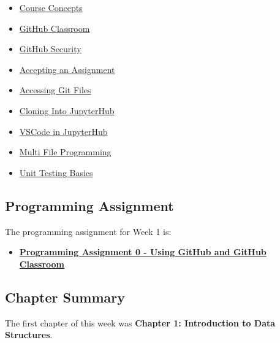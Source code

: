 \begin{itemize}
    \item \href{https://www.youtube.com/watch?v=l3e6UsF1RdQ}{Course Concepts}
    \item \href{https://www.youtube.com/watch?v=hu81oFq0nA8}{GitHub Classroom}
    \item \href{https://www.youtube.com/watch?v=7_x86HeoglQ&t=178s}{GitHub Security}
    \item \href{https://www.youtube.com/watch?v=b0Ystl84XYY}{Accepting an Assignment}
    \item \href{https://applied.cs.colorado.edu/mod/page/view.php?id=45856}{Accessing Git Files}
    \item \href{https://www.youtube.com/watch?v=M293X5ssks4}{Cloning Into JupyterHub}
    \item \href{https://www.youtube.com/watch?v=dptdfci_Zn0}{VSCode in JupyterHub}
    \item \href{https://www.youtube.com/watch?v=jchWSvAdadE}{Multi File Programming}
    \item \href{https://www.youtube.com/watch?v=tsVh8mG2tM0}{Unit Testing Basics}
\end{itemize}

\subsection{Programming Assignment}

The programming assignment for Week 1 is:

\begin{itemize}
    \item \href{https://github.com/QuantumCompiler/CU/tree/main/CSPB%202270%20-%20Data%20Structures/Assignments/Assignment%200%20-%20GitHub}{\textbf{Programming Assignment 0 - Using GitHub and GitHub Classroom}}
\end{itemize}

\subsection{Chapter Summary}

The first chapter of this week was \textbf{Chapter 1: Introduction to Data Structures}.

